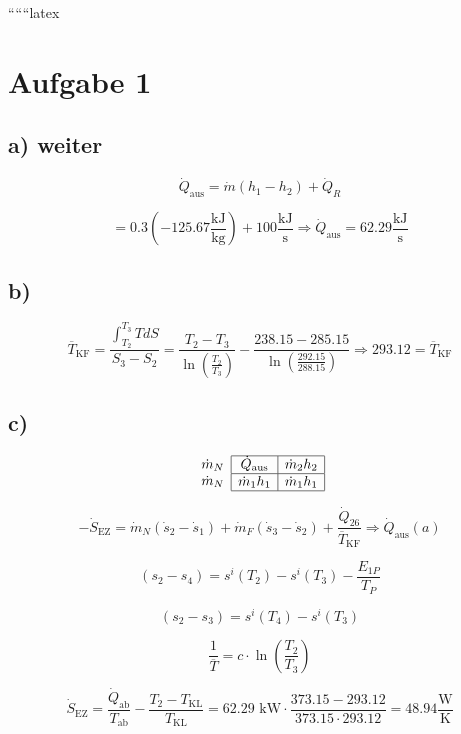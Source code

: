 
``````latex


\section*{Aufgabe 1}

\subsection*{a) weiter}

\[
\dot{Q}_{\text{aus}} = \dot{m} (h_1 - h_2) + \dot{Q}_R
\]

\[
= 0.3 \left( -125.67 \frac{\text{kJ}}{\text{kg}} \right) + 100 \frac{\text{kJ}}{\text{s}} \Rightarrow \boxed{\dot{Q}_{\text{aus}} = 62.29 \frac{\text{kJ}}{\text{s}}}
\]

\subsection*{b)}

\[
\overline{T}_{\text{KF}} = \frac{\int_{T_2}^{T_3} T dS}{S_3 - S_2} = \frac{T_2 - T_3}{\ln \left( \frac{T_2}{T_3} \right)} - \frac{238.15 - 285.15}{\ln \left( \frac{292.15}{288.15} \right)} \Rightarrow 293.12 = \overline{T}_{\text{KF}}
\]

\subsection*{c)}

\[
\begin{array}{c}
\dot{m}_N \\
\dot{m}_N
\end{array}
\begin{array}{|c|c|}
\hline
\dot{Q}_{\text{aus}} & \dot{m}_2 h_2 \\
\hline
\dot{m}_1 h_1 & \dot{m}_1 h_1 \\
\hline
\end{array}
\]

\[
-\dot{S}_{\text{EZ}} = \dot{m}_N (\dot{s}_2 - \dot{s}_1) + \dot{m}_F (\dot{s}_3 - \dot{s}_2) + \frac{\dot{Q}_{26}}{\overline{T}_{\text{KF}}} \Rightarrow \dot{Q}_{\text{aus}} (a)
\]

\[
(s_2 - s_4) = s^i (T_2) - s^i (T_3) - \frac{E_{1P}}{T_P}
\]

\[
(s_2 - s_3) = s^i (T_4) - s^i (T_3)
\]

\[
\frac{1}{\overline{T}} = c \cdot \ln \left( \frac{T_2}{T_3} \right)
\]

\[
\dot{S}_{\text{EZ}} = \frac{\dot{Q}_{\text{ab}}}{T_{\text{ab}}} - \frac{T_2 - T_{\text{KL}}}{T_{\text{KL}}} = 62.29 \text{ kW} \cdot \frac{373.15 - 293.12}{373.15 \cdot 293.12} = 48.94 \frac{\text{W}}{\text{K}}
\]

